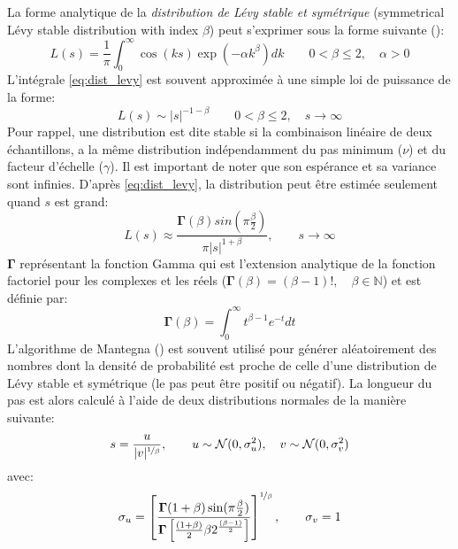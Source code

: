 La forme analytique de la \emph{distribution de Lévy stable et symétrique} (symmetrical Lévy stable distribution with index $\beta$) peut
s’exprimer sous la forme suivante (\cite{Gutowski2001}):
\begin{equation}\label{eq:dist_levy}
    L(s) = \frac{1}{\pi} \int_{0}^{\infty} \cos(k s)\exp(-\alpha k^{\beta}) dk \qquad  0 < \beta \leq 2, \quad \alpha > 0
\end{equation}
L’intégrale \eqref{eq:dist_levy} est souvent approximée à une simple loi de puissance de la forme:
\begin{equation}\label{eq:power_levy}
    L(s) \sim \mathopen{|}s\mathclose{|}^{-1-\beta} \qquad  0 < \beta \leq 2, \quad s \to \infty
\end{equation}
Pour rappel, une distribution est dite stable si la
combinaison linéaire de deux échantillons, a la même distribution indépendamment du pas minimum ($\nu$) et du facteur
d’échelle ($\gamma$).
Il est important de noter que son espérance et sa variance sont infinies.
D’après \eqref{eq:dist_levy}, la distribution peut être estimée seulement quand $s$ est grand:
\begin{equation}
    L(s) \approx \frac{\mathbf{\Gamma}(\beta)sin(\pi\frac{\beta}{2})}{\pi\mathopen{|}s\mathclose{|}^{1+\beta}}, \qquad s \to \infty
\end{equation}
$\mathbf{\Gamma}$ représentant la fonction Gamma qui est l’extension analytique de la fonction factoriel pour
les complexes et les réels ($\mathbf{\Gamma}(\beta) = (\beta -1)!, \quad \beta\in \mathbb{N}$) et est définie par:
\begin{equation}
    \mathbf{\Gamma}(\beta) = \int_{0}^{\infty} t^{\beta-1}e^{-t} dt
\end{equation}
L’algorithme de Mantegna (\cite{Mantegna19944677}) est souvent utilisé pour générer aléatoirement des nombres
dont la densité de probabilité est proche de celle d’une distribution de Lévy stable et symétrique (le pas peut
être positif ou négatif).
La longueur du pas est alors calculé à l’aide de deux distributions normales de la manière suivante:
\begin{equation}\label{eq:step_len}
    s = \frac{u}{\mathopen{|}v\mathclose{|}^{\nicefrac{1}{\beta}}}, \qquad u \sim \mathcal{N}(0, \sigma_{u}^{2}), \quad v \sim \mathcal{N}(0, \sigma_{v}^{2})
\end{equation}
avec:
\begin{equation}\label{eq:sigmas}
    \sigma_{u} = \left[ \frac{\mathbf{\Gamma}(1+\beta)\sin(\pi\frac{\beta}{2})}%
                             {\mathbf{\Gamma} \left[\frac{(1+\beta)}{2}\beta 2^{\frac{(\beta-1)}{2}}\right]}\right]^{\nicefrac{1}{\beta}},%
    \qquad \sigma_{v} = 1
\end{equation}

